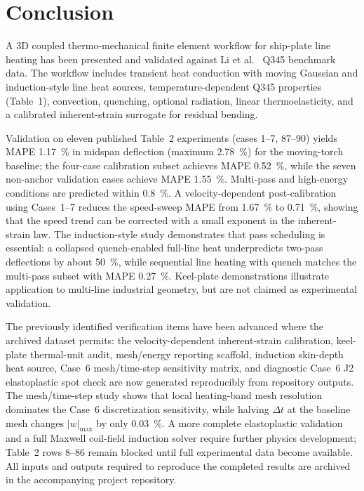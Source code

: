 \section{Conclusion}
\label{sec:conclusion}

A 3D coupled thermo-mechanical finite element workflow for ship-plate line heating has been presented and validated against Li et al.\ \cite{li2023} Q345 benchmark data. The workflow includes transient heat conduction with moving Gaussian and induction-style line heat sources, temperature-dependent Q345 properties (Table~1), convection, quenching, optional radiation, linear thermoelasticity, and a calibrated inherent-strain surrogate for residual bending.

Validation on eleven published Table~2 experiments (cases 1--7, 87--90) yields MAPE \SI{1.17}{\%} in midspan deflection (maximum \SI{2.78}{\%}) for the moving-torch baseline; the four-case calibration subset achieves MAPE \SI{0.52}{\%}, while the seven non-anchor validation cases achieve MAPE \SI{1.55}{\%}. Multi-pass and high-energy conditions are predicted within \SI{0.8}{\%}. A velocity-dependent post-calibration using Cases~1--7 reduces the speed-sweep MAPE from \SI{1.67}{\%} to \SI{0.71}{\%}, showing that the speed trend can be corrected with a small exponent in the inherent-strain law. The induction-style study demonstrates that pass scheduling is essential: a collapsed quench-enabled full-line heat underpredicts two-pass deflections by about \SI{50}{\%}, while sequential line heating with quench matches the multi-pass subset with MAPE \SI{0.27}{\%}. Keel-plate demonstrations illustrate application to multi-line industrial geometry, but are not claimed as experimental validation.

The previously identified verification items have been advanced where the archived dataset permits: the velocity-dependent inherent-strain calibration, keel-plate thermal-unit audit, mesh/energy reporting scaffold, induction skin-depth heat source, Case~6 mesh/time-step sensitivity matrix, and diagnostic Case~6 J2 elastoplastic spot check are now generated reproducibly from repository outputs. The mesh/time-step study shows that local heating-band mesh resolution dominates the Case~6 discretization sensitivity, while halving $\Delta t$ at the baseline mesh changes $|w|_{\max}$ by only \SI{0.03}{\%}. A more complete elastoplastic validation and a full Maxwell coil-field induction solver require further physics development; Table~2 rows 8--86 remain blocked until full experimental data become available. All inputs and outputs required to reproduce the completed results are archived in the accompanying project repository.
